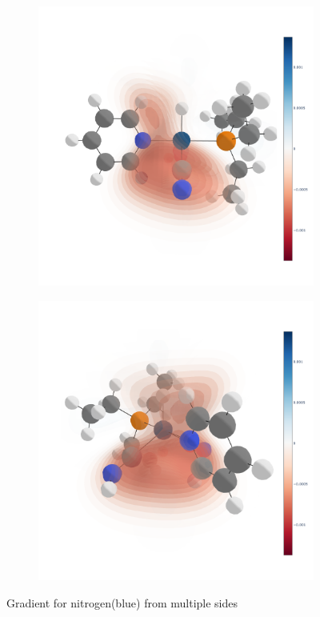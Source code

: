 \begin{figure}
  \medskip

  \begin{subfigure}[t]{.5\textwidth}
    \centering
    \includegraphics[width=\linewidth]{figures/evaluation/elem2-N-SIDE.png}
  \end{subfigure}
  \hfill
  \begin{subfigure}[t]{.5\textwidth}
    \centering
    \includegraphics[width=\linewidth]{figures/evaluation/elem2-N-BACK.png}
  \end{subfigure}
  \caption[Gradient in 3D space from multiple angles]{Gradient for nitrogen(blue) from multiple sides}
  \label{fig:gradient-sides}
\end{figure}


